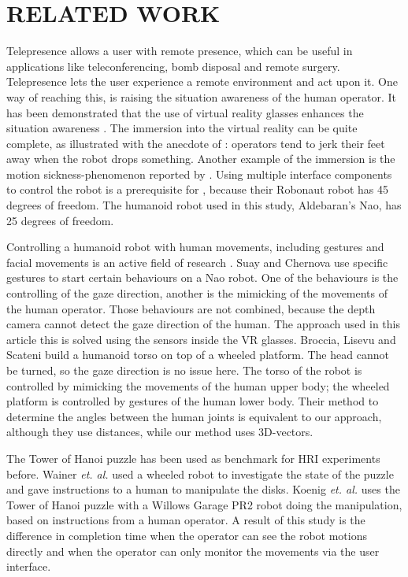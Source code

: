 \documentclass[letterpaper, 10pt, conference]{ieeeconf}
\begin{document}
\section{RELATED WORK}

Telepresence allows a user with remote presence, which can be useful in applications like teleconferencing, bomb disposal and
remote surgery. Telepresence lets the user experience a remote environment and act upon
it. One way of reaching this, is raising the situation awareness of the human
operator\cite{Sheridan1992, Goodrich2007}. It has been demonstrated that the use of virtual reality glasses enhances the situation awareness \cite{Goza2004,VanErp2006}. 
The immersion into the virtual reality can be quite complete, as illustrated with the anecdote of \cite{Goza2004}: operators tend to jerk their feet away when the robot drops something. Another example of the immersion is the motion sickness-phenomenon reported by \cite{VanErp2006}.
Using multiple interface components to control the robot is a prerequisite for \cite{Goodrich2007}, because their Robonaut robot 
has 45 degrees of freedom. The humanoid robot used in this study, Aldebaran's Nao, has 25 degrees of freedom.

Controlling a humanoid robot with human movements, including gestures and facial movements is an active field of research \cite{Suay2011, Broccia2011}. %
Suay and Chernova \cite{Suay2011} use specific gestures to start certain behaviours on a Nao robot. One of the behaviours is the controlling of the gaze direction,
another is the mimicking of the movements of the human operator. Those behaviours are not combined, because the depth camera cannot detect 
the gaze direction of the human. The approach used in this article this is solved using the sensors inside the VR glasses. 
Broccia, Lisevu and Scateni \cite{Broccia2011} build a humanoid torso on top of a wheeled platform. The head cannot be turned, so the gaze 
direction is no issue here. The torso of the robot is controlled by mimicking the movements of the human upper body; the wheeled platform
is controlled by gestures of the human lower body. Their method
to determine the angles between the human joints is equivalent to our approach, although they use distances, while our
method uses 3D-vectors.

The Tower of Hanoi puzzle has been used as benchmark for HRI experiments before\cite{Wainer2007,Koenig2010}. 
Wainer \textit{et. al.}\cite{Wainer2007} used a wheeled robot to investigate the state of the puzzle and gave instructions to a human
to manipulate the disks. Koenig \textit{et. al.}\cite{Koenig2010} uses the Tower of Hanoi puzzle with a Willows Garage PR2 robot doing the 
manipulation, based on instructions from a human operator. A result of this study is the difference in completion time when the operator
can see the robot motions directly and when the operator can only monitor the movements via the user interface.
\end{document}
